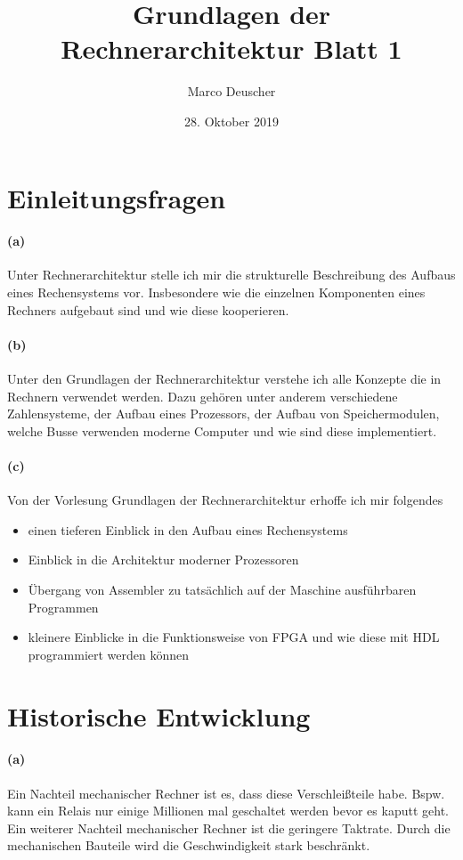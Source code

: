 \documentclass[a4paper]{article}
\title{Grundlagen der Rechnerarchitektur Blatt 1}
\author{Marco Deuscher}
\date{28. Oktober 2019}
\begin{document}
\maketitle

\section{Einleitungsfragen}
\paragraph{(a)}
Unter Rechnerarchitektur stelle ich mir die strukturelle Beschreibung des Aufbaus eines Rechensystems vor. Insbesondere wie die einzelnen Komponenten eines Rechners aufgebaut sind und wie diese kooperieren. 

\paragraph{(b)}
Unter den Grundlagen der Rechnerarchitektur verstehe ich alle Konzepte die in Rechnern verwendet werden. Dazu gehören unter anderem verschiedene Zahlensysteme, der Aufbau eines Prozessors, der Aufbau von Speichermodulen, welche Busse verwenden moderne Computer und wie sind diese implementiert.

\paragraph{(c)}
Von der Vorlesung Grundlagen der Rechnerarchitektur erhoffe ich mir folgendes
\begin{itemize}
    \item einen tieferen Einblick in den Aufbau eines Rechensystems
    \item Einblick in die Architektur moderner Prozessoren
    \item Übergang von Assembler zu tatsächlich auf der Maschine ausführbaren Programmen
    \item kleinere Einblicke in die Funktionsweise von FPGA und wie diese mit HDL programmiert werden können
\end{itemize}



\section{Historische Entwicklung}
\paragraph{(a)}
Ein Nachteil mechanischer Rechner ist es, dass diese Verschleißteile habe. Bspw. kann ein Relais nur einige Millionen mal geschaltet werden bevor es kaputt geht.\\
Ein weiterer Nachteil mechanischer Rechner ist die geringere Taktrate. Durch die mechanischen Bauteile wird die Geschwindigkeit stark beschränkt.
\end{document}

